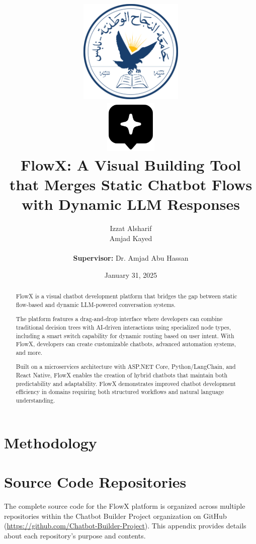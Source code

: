 \documentclass[12pt, a4paper]{report}
\title{
    \includegraphics[height=5cm]{assets/NNU_Logo.png} \\[1cm]
    \includegraphics[height=2.5cm]{assets/FlowX_Logo.png} \\[1cm]
    FlowX: A Visual Building Tool that Merges Static Chatbot Flows with Dynamic LLM Responses
}
\author{
    Izzat Alsharif \\
    Amjad Kayed
    \\\\
    \textbf{Supervisor:} Dr. Amjad Abu Hassan
}
\date{January 31, 2025}
\begin{document}
\maketitle
\tableofcontents
\listoffigures

\begin{abstract}
FlowX is a visual chatbot development platform that bridges the gap between static flow-based and dynamic LLM-powered conversation systems. 
\par\medskip
The platform features a drag-and-drop interface where developers can combine traditional decision trees with AI-driven interactions using specialized node types, including a smart switch capability for dynamic routing based on user intent. With FlowX, developers can create customizable chatbots, advanced automation systems, and more.
\par\medskip
Built on a microservices architecture with ASP.NET Core, Python/LangChain, and React Native, FlowX enables the creation of hybrid chatbots that maintain both predictability and adaptability. FlowX demonstrates improved chatbot development efficiency in domains requiring both structured workflows and natural language understanding.
\end{abstract}






\chapter{Methodology}









\appendix
\chapter{Source Code Repositories}
The complete source code for the FlowX platform is organized across multiple repositories within the Chatbot Builder Project organization on GitHub (\url{https://github.com/Chatbot-Builder-Project}). This appendix provides details about each repository's purpose and contents.
\end{document}
